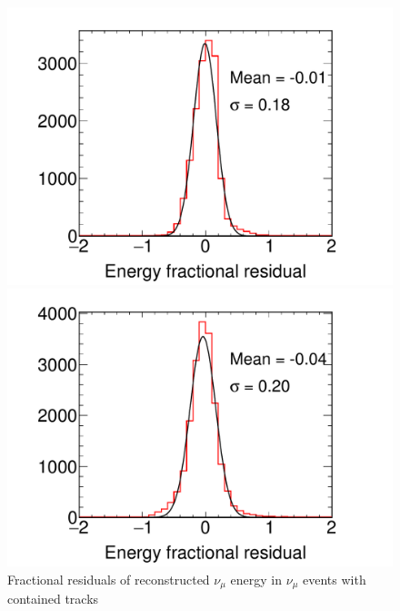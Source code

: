 \begin{figure}
    \centering
    \begin{minipage}[t]{0.3\textwidth}
        \centering
        \hspace*{-0.5in}
        \includegraphics[width=1.37\textwidth]{graphics/EnergyResContTweak_largeFont.pdf}
        \caption[Fractional residuals of reconstructed $\nu_{\mu}$ energy in CC events with contained tracks]{Fractional residuals of reconstructed $\nu_{\mu}$ energy in $\nu_{\mu}$  events with contained tracks} 
        \label{fig:enresnumucont}
    \end{minipage}\hfill
    \begin{minipage}[t]{0.3\textwidth}
        \centering
        \hspace*{-0.5in}
        \includegraphics[width=1.37\textwidth]{graphics/EnergyResExitTweak_largeFont.pdf}

\end{minipage}
\end{figure}
